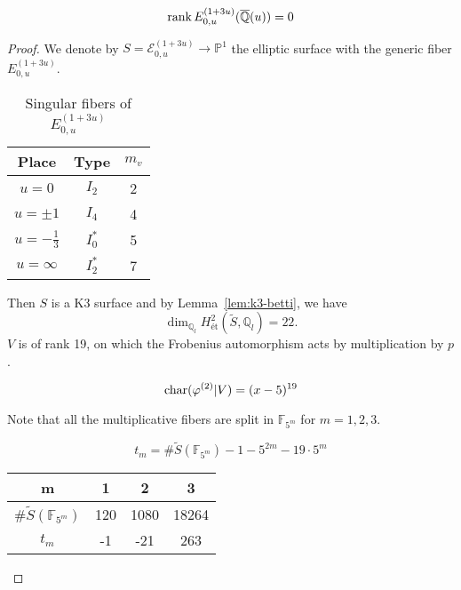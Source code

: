 \documentclass[main]{subfiles}
\begin{document}
\begin{thm}
    \begin{equation}
        \operatorname{rank} E_{0,u}^{(1 + 3u)}(\overline{\mathbb{Q}}(u)) = 0
    \end{equation}
\end{thm}
\begin{proof}
We denote by $S=\mathcal{E}_{0,u}^{(1 + 3u)} \to \mathbb{P}^1$ the elliptic surface with the generic fiber $E_{0,u}^{(1 + 3u)}$.

\begin{table}[h]
    \centering
    \caption{Singular fibers of $E_{0,u}^{(1 + 3u)}$}
    \begin{tabular}{|c|c|c|}
        \hline
        Place            & Type    & $m_v$ \\
        \hline
        $u=0$            & $I_2$   & 2     \\
        $u=\pm 1$        & $I_4$   & 4     \\
        $u=-\frac{1}{3}$ & $I_0^*$ & 5     \\
        $u=\infty$       & $I_2^*$ & 7     \\
        \hline
    \end{tabular}
    \label{tab:E_{0,u}^{(1 + 3u)}}
\end{table}
Then $S$ is a K3 surface and by Lemma~\ref{lem:k3-betti}, we have
\begin{equation}
    \dim_{\mathbb{Q}_{l}} H_{\text{\'et}}^{2}(\tilde{S}, \mathbb{Q}_{l}) = 22.
\end{equation}
$V$ is of rank 19, on which the Frobenius automorphism acts by multiplication by $p$.

\begin{equation}
    \operatorname{char} (\varphi^{(2)} | V) = (x - 5)^{19}
\end{equation}

Note that all the multiplicative fibers are split in $\mathbb{F}_{5^{m}}$ for $m=1,2,3$.

\begin{equation}
    t_{m} = \# \tilde{S}(\mathbb{F}_{5^{m}}) - 1 - 5^{2m} - 19 \cdot 5^{m}
\end{equation}

\begin{table}[h]
    \centering
    \begin{tabular}{|c|c|c|c|}
        \hline
        m                                & 1   & 2    & 3     \\
        \hline
        $\# \tilde{S}(\mathbb{F}_{5^m})$ & 120 & 1080 & 18264 \\
        \hline
        $t_m$                            & -1  & -21  & 263   \\
        \hline
    \end{tabular}
    \label{tab:sample}
\end{table}


\end{proof}
\end{document}
